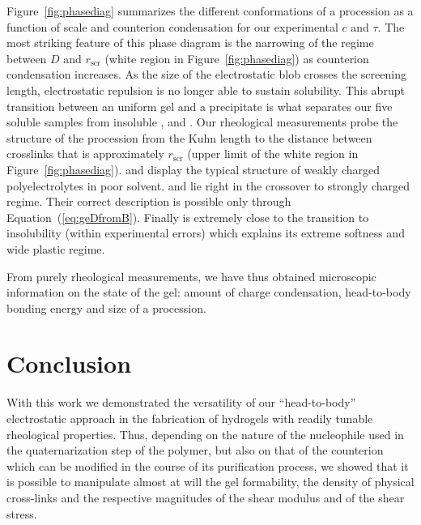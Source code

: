 \documentclass[twoside,twocolumn,9pt]{article}
\begin{document}
Figure~\ref{fig:phasediag} summarizes the different conformations of a procession as a function of scale and counterion condensation for our experimental $c$ and $\tau$. The most striking feature of this phase diagram is the narrowing of the regime between $D$ and $r_\mathrm{scr}$ (white region in Figure~\ref{fig:phasediag}) as counterion condensation increases. As the size of the electrostatic blob crosses the screening length, electrostatic repulsion is no longer able to sustain solubility. This abrupt transition between an uniform gel and a precipitate is what separates our five soluble samples from insoluble ,  and . Our rheological measurements probe the structure of the procession from the Kuhn length to the distance between crosslinks that is approximately $r_\mathrm{scr}$ (upper limit of the white region in Figure~\ref{fig:phasediag}).  and  display the typical structure of weakly charged polyelectrolytes in poor solvent.  and  lie right in the crossover to strongly charged regime. Their correct description is possible only through Equation~(\ref{eq:geDfromB}). Finally  is extremely close to the transition to insolubility (within experimental errors) which explains its extreme softness and wide plastic regime.

From purely rheological measurements, we have thus obtained microscopic information on the state of the gel: amount of charge condensation, head-to-body bonding energy and size of a procession.




\section{Conclusion}
With this work we demonstrated the versatility of our ``head-to-body'' electrostatic approach in the fabrication of hydrogels with readily tunable rheological properties. Thus, depending on the nature of the nucleophile used in the quaternarization step of the polymer, but also on that of the counterion which can be modified in the course of its purification process, we showed that it is possible to manipulate almost at will the gel formability, the density of physical cross-links and the respective magnitudes of the shear modulus and of the shear stress. 
\end{document}
